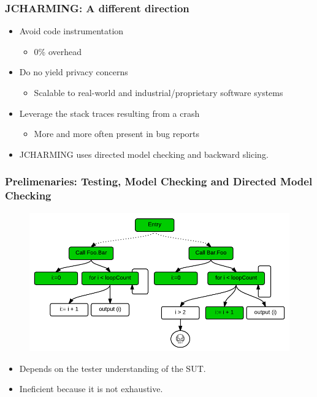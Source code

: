 \documentclass{beamer}
\begin{document}
\begin{frame}
\frametitle{JCHARMING: A different direction}
\begin{itemize}

\item Avoid code instrumentation
\begin{itemize}
\vspace{0.3cm}
\item 0\% overhead
\end{itemize}
\vspace{0.3cm}
\item Do no yield privacy concerns
\begin{itemize}
\vspace{0.3cm}
\item Scalable to real-world and industrial/proprietary software systems
\end{itemize}
\vspace{0.3cm}
\item Leverage the stack traces resulting from a crash
\begin{itemize}
\vspace{0.3cm}
\item More and more often present in bug reports
\end{itemize}
\vspace{0.3cm}
\item JCHARMING uses directed model checking and backward slicing.
\end{itemize}
\end{frame}

\begin{frame}
\frametitle{Prelimenaries: \textbf{Testing}, Model Checking and Directed Model Checking}

\begin{figure}
\includegraphics[width=0.75\linewidth]{media/test.png}
\end{figure}
\begin{itemize}
\item Depends on the tester understanding of the SUT.
\item Ineficient because it is not exhaustive.
\end{itemize}

\end{frame}
\end{document}
